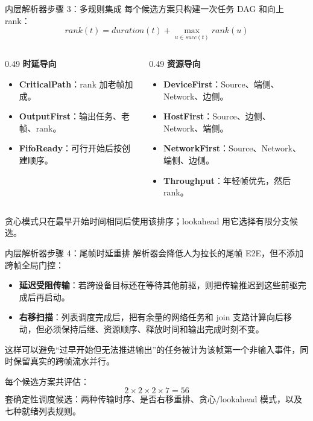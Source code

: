 \documentclass[aspectratio=169]{ctexbeamer}
\begin{document}
\begin{frame}{内层解析器步骤 3：多规则集成}
  \small
  每个候选方案只构建一次任务 DAG 和向上 rank：
  \[
    rank(t)=duration(t)+\max_{u \in succ(t)} rank(u)
  \]
  \begin{columns}[T,onlytextwidth]
    \begin{column}{0.49\textwidth}
      \textbf{时延导向}
      \begin{itemize}
        \item \textbf{CriticalPath}：rank 加老帧加成。
        \item \textbf{OutputFirst}：输出任务、老帧、rank。
        \item \textbf{FifoReady}：可行开始后按创建顺序。
      \end{itemize}
    \end{column}
    \begin{column}{0.49\textwidth}
      \textbf{资源导向}
      \begin{itemize}
        \item \textbf{DeviceFirst}：Source、端侧、Network、边侧。
        \item \textbf{HostFirst}：Source、边侧、Network、端侧。
        \item \textbf{NetworkFirst}：Source、Network、端侧、边侧。
        \item \textbf{Throughput}：年轻帧优先，然后 rank。
      \end{itemize}
    \end{column}
  \end{columns}
  \vspace{0.4em}

  贪心模式只在最早开始时间相同后使用该排序；lookahead 用它选择有限分支候选。
\end{frame}

\begin{frame}{内层解析器步骤 4：尾帧时延重排}
  解析器会降低人为拉长的尾帧 E2E，但不添加跨帧全局门控：
  \begin{itemize}
    \item \textbf{延迟受阻传输}：若跨设备目标还在等待其他前驱，则把传输推迟到这些前驱完成后再启动。
    \item \textbf{右移扫描}：列表调度完成后，把有余量的网络任务和 join 支路计算向后移动，但必须保持后继、资源顺序、释放时间和输出完成时刻不变。
  \end{itemize}
  这样可以避免“过早开始但无法推进输出”的任务被计为该帧第一个非输入事件，同时保留真实的跨帧流水并行。
  \vspace{0.5em}

  每个候选方案共评估：
  \[
    2 \times 2 \times 2 \times 7 = 56
  \]
  套确定性调度候选：两种传输时序、是否右移重排、贪心/lookahead 模式，以及七种就绪列表规则。
\end{frame}
\end{document}
